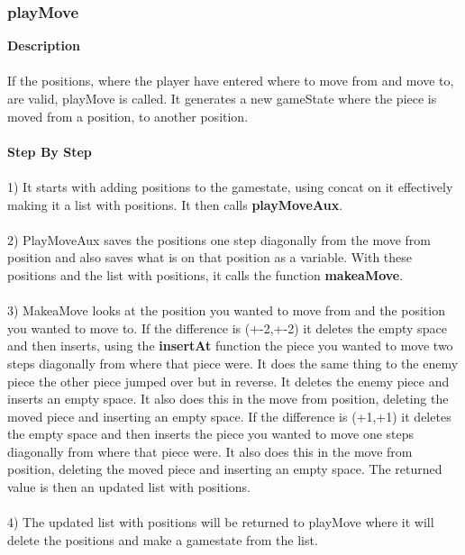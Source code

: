 \documentclass[12pt,a4paper]{article}
\begin{document}
{\subsubsection{playMove}}
\textbf{Description}\\\\If the positions, where the player have entered where to move from and move to, are valid, playMove is called. 
It generates a new gameState where the piece is moved from a position, to another position.\\\\
\textbf{Step By Step}\\\\
1) It starts with adding positions to the gamestate, using concat on it effectively making it a list with positions. It then calls {\textbf{\small{playMoveAux}}}.
\\\\
2) PlayMoveAux saves the positions one step diagonally from the move from position and also saves what is on that position as a variable. With these positions and the list with positions, it calls the function {\textbf{\small{makeaMove}}}.\\\\
3) MakeaMove looks at the position you wanted to move from and the position you wanted to move to. If the difference is (+-2,+-2) it deletes the empty space and then inserts, using the {\textbf{\small{insertAt}}} function the piece you wanted to move two steps diagonally from where that piece were. It does the same thing to the enemy piece the other piece jumped over but in reverse. It deletes the enemy piece and inserts an empty space. It also does this in the move from position, deleting the moved piece and inserting an empty space. 
If the difference is (+1,+1) it deletes the empty space and then inserts the piece you wanted to move one steps diagonally from where that piece were.  It also does this in the move from position, deleting the moved piece and inserting an empty space. The returned value is then an updated list with positions.\\\\
4) The updated list with positions will be returned to playMove where it will delete the positions and make a gamestate from the list.\\\\
\end{document}
